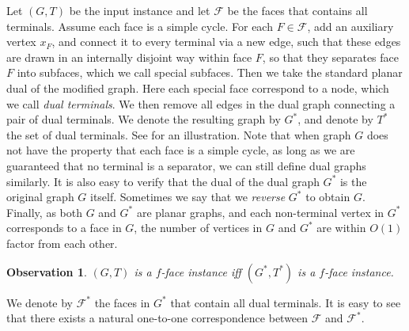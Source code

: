 \documentclass[11pt]{article}
\newtheorem{observation}[theorem]{Observation}
\theoremstyle{definition}
\newcommand{\fset}{{\mathcal{F}}}
\newcounter{note}
\begin{document}
Let $(G,T)$ be the input instance and let $\fset$ be the faces that contains all terminals.
Assume each face is a simple cycle. For each $F\in \fset$, add an auxiliary vertex $x_F$, and connect it to every terminal via a new edge, such that these edges are drawn in an internally disjoint way within face $F$, so that they separates face $F$ into subfaces, which we call special subfaces. Then we take the standard planar dual of the modified graph.
Here each special face correspond to a node, which we call \emph{dual terminals}. We then remove all edges in the dual graph connecting a pair of dual terminals. We denote the resulting graph by $G^*$, and denote by $T^*$ the set of dual terminals. See  for an illustration.
Note that when graph $G$ does not have the property that each face is a simple cycle, as long as we are guaranteed that no terminal is a separator, we can still define dual graphs similarly.
It is also easy to verify that the dual of the dual graph $G^*$ is the original graph $G$ itself. Sometimes we say that we \emph{reverse} $G^*$ to obtain $G$.
Finally, as both $G$ and $G^*$ are planar graphs, and each non-terminal vertex in $G^*$ corresponds to a face in $G$, the number of vertices in $G$ and $G^*$ are within $O(1)$ factor from each other.


\begin{observation}
	$(G,T)$ is a $f$-face instance iff $(G^*,T^*)$ is a $f$-face instance.
\end{observation}
We denote by $\fset^*$ the faces in $G^*$ that contain all dual terminals. It is easy to see that there exists a natural one-to-one correspondence between $\fset$ and $\fset^*$.
\end{document}
